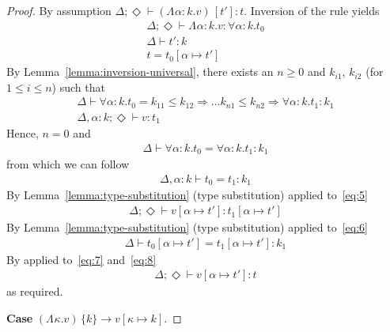 \documentclass{article}
\newcommand{\KVAR}{\kappa}
\newcommand{\TASS}[1]{#1\colon\!}
\newcommand{\TVAR}{\alpha}
\newcommand{\TALL}[2]{\forall\TASS{#1}#2.}
\newcommand{\TLAM}[3][{}]{\Lambda^{#1}\TASS{#2}#3.}
\newcommand{\TAPP}[2]{#1\,[#2]}
\newcommand{\KLAM}[2][{}]{\Lambda^{#1}#2.}
\newcommand{\KAPP}[2]{#1\,\{#2\}}
\newcommand{\KENV}{\Delta}
\newcommand{\TENVEMPTY}{\Diamond}
\newcommand\stepsto{\longrightarrow}
\begin{document}
\begin{proof}
  By assumption
  $\KENV;\TENVEMPTY \vdash \TAPP{(\TLAM \TVAR k v)}{t'} :
  t$. Inversion of the  rule yields
  \begin{gather}
    \KENV; \TENVEMPTY \vdash \TLAM \TVAR k v : \TALL\TVAR k t_0 \\
    \KENV \vdash t' : k \\
    t = t_0 [\TVAR\mapsto t']
  \end{gather}
  By Lemma~\ref{lemma:inversion-universal}, there exists an $n\ge0$ and $k_{i1}$, $k_{i2}$ (for $1\le i\le n$) such that
  \begin{gather}
    \KENV \vdash \TALL\TVAR k t_0 = k_{11}\le k_{12}\Rightarrow \dots k_{n1}\le k_{n2} \Rightarrow \TALL\TVAR k t_1 : k_1
    \\
    \label{eq:5}
    \KENV, \TASS \TVAR{k}; \TENVEMPTY \vdash v : t_1
  \end{gather}
  Hence, $n=0$ and
  \begin{gather}
    \KENV \vdash \TALL\TVAR k t_0 = \TALL\TVAR k t_1 : k_1
  \end{gather}
  from which we can follow
  \begin{gather}
    \label{eq:6}
    \KENV, \TASS\TVAR k \vdash t_0 = t_1 : k_1
  \end{gather}
  By Lemma~\ref{lemma:type-substitution} (type substitution) applied to~\eqref{eq:5}
  \begin{gather}
    \label{eq:7}
    \KENV; \TENVEMPTY \vdash v[\TVAR \mapsto t'] : t_1[\TVAR \mapsto t']
  \end{gather}
  By Lemma~\ref{lemma:type-substitution} (type substitution) applied to~\eqref{eq:6}
  \begin{gather}
    \label{eq:8}
    \KENV \vdash t_0[\TVAR \mapsto t'] = t_1[\TVAR \mapsto t'] : k_1
  \end{gather}
  By  applied to~\eqref{eq:7} and~\eqref{eq:8}
  \begin{gather}
    \KENV; \TENVEMPTY \vdash v[\TVAR \mapsto t'] : t
  \end{gather}
  as required.

  \textbf{Case} $\KAPP{(\KLAM \KVAR v)}k \stepsto v[\KVAR \mapsto k]$.


\end{proof}
\end{document}
